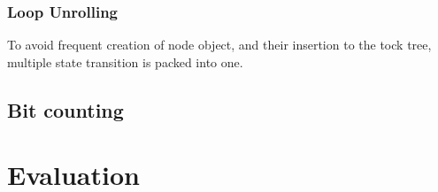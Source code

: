 \documentclass[acmsmall]{acmart}
\begin{document}
	\subsubsection{Loop Unrolling}
	To avoid frequent creation of node object, and their insertion to the tock tree, multiple state transition is packed into one.
	\subsection{Bit counting}
	
	\section{Evaluation}
\appendix
\end{document}
